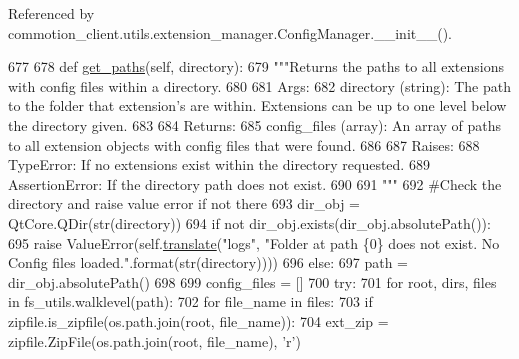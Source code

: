 Referenced by commotion\-\_\-client.\-utils.\-extension\-\_\-manager.\-Config\-Manager.\-\_\-\-\_\-init\-\_\-\-\_\-().


\begin{DoxyCode}
677 
678     \textcolor{keyword}{def }\hyperlink{classcommotion__client_1_1utils_1_1extension__manager_1_1ConfigManager_ac8075c8f0e46b33f63c4b79f91d2ee3e}{get\_paths}(self, directory):
679         \textcolor{stringliteral}{"""Returns the paths to all extensions with config files within a directory.}
680 \textcolor{stringliteral}{        }
681 \textcolor{stringliteral}{        Args:}
682 \textcolor{stringliteral}{          directory (string): The path to the folder that extension's are within. Extensions can be up to
       one level below the directory given.}
683 \textcolor{stringliteral}{        }
684 \textcolor{stringliteral}{        Returns:}
685 \textcolor{stringliteral}{          config\_files (array): An array of paths to all extension objects with config files that were
       found.}
686 \textcolor{stringliteral}{        }
687 \textcolor{stringliteral}{        Raises:}
688 \textcolor{stringliteral}{          TypeError: If no extensions exist within the directory requested.}
689 \textcolor{stringliteral}{          AssertionError: If the directory path does not exist.}
690 \textcolor{stringliteral}{        }
691 \textcolor{stringliteral}{        """}
692         \textcolor{comment}{#Check the directory and raise value error if not there}
693         dir\_obj = QtCore.QDir(str(directory))
694         \textcolor{keywordflow}{if} \textcolor{keywordflow}{not} dir\_obj.exists(dir\_obj.absolutePath()):
695             \textcolor{keywordflow}{raise} ValueError(self.\hyperlink{classcommotion__client_1_1utils_1_1extension__manager_1_1ConfigManager_aa0ce09aefdd36656f0a1abfad14e9ff1}{translate}(\textcolor{stringliteral}{"logs"}, \textcolor{stringliteral}{"Folder at path \{0\} does not exist. No Config
       files loaded."}.format(str(directory))))
696         \textcolor{keywordflow}{else}:
697             path = dir\_obj.absolutePath()
698 
699         config\_files = []
700         \textcolor{keywordflow}{try}:
701             \textcolor{keywordflow}{for} root, dirs, files \textcolor{keywordflow}{in} fs\_utils.walklevel(path):
702                 \textcolor{keywordflow}{for} file\_name \textcolor{keywordflow}{in} files:
703                     \textcolor{keywordflow}{if} zipfile.is\_zipfile(os.path.join(root, file\_name)):
704                         ext\_zip = zipfile.ZipFile(os.path.join(root, file\_name), \textcolor{stringliteral}{'}\textcolor{stringliteral}{r')}

\end{DoxyCode}
